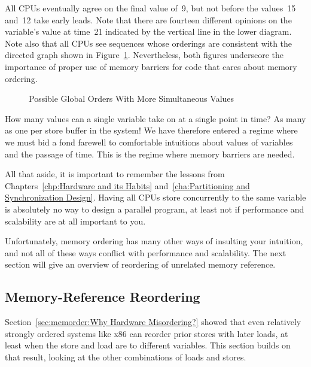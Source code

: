 All CPUs eventually agree on the final value of~9, but not before
the values~15 and~12 take early leads.
Note that there are fourteen different opinions on the variable's value
at time~21 indicated by the vertical line in the lower diagram.
Note also that all CPUs see sequences whose orderings are consistent with
the directed graph shown in
Figure~\ref{fig:memorder:Possible Global Orders With More Simultaneous Values}.
Nevertheless, both figures underscore the importance of
proper use of memory barriers for code that cares about memory ordering.

\begin{figure}[htb]
\centering
{}
\caption{Possible Global Orders With More Simultaneous Values}
\label{fig:memorder:Possible Global Orders With More Simultaneous Values}
\end{figure}

How many values can a single variable take on at a single point in
time?
As many as one per store buffer in the system!
We have therefore entered a regime where we must bid a fond farewell to
comfortable intuitions about values of variables and the passage of time.
This is the regime where memory barriers are needed.

All that aside, it is important to remember the lessons from
Chapters~\ref{chp:Hardware and its Habits}
and~\ref{cha:Partitioning and Synchronization Design}.
Having all CPUs store concurrently to the same variable
is absolutely no way to design a parallel program, at least
not if performance and scalability are at all important to you.

Unfortunately, memory ordering has many other ways of insulting your
intuition, and not all of these ways conflict with performance and
scalability.
The next section will give an overview of reordering of unrelated
memory reference.

\subsection{Memory-Reference Reordering}
\label{sec:memorder:Memory-Reference Reordering}

Section~\ref{sec:memorder:Why Hardware Misordering?}
showed that even relatively strongly ordered systems like x86
can reorder prior stores with later loads, at least when the
store and load are to different variables.
This section builds on that result, looking at the other combinations of
loads and stores.

